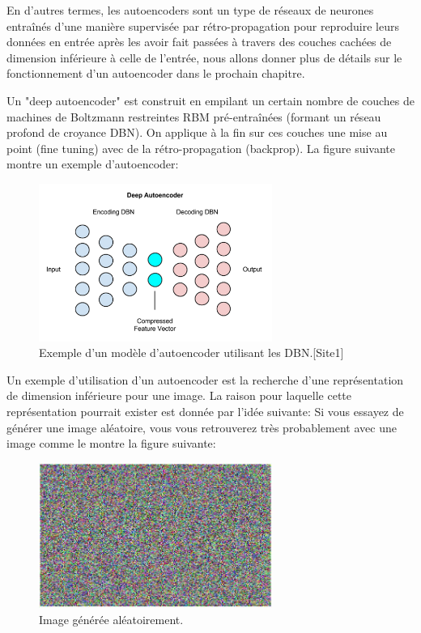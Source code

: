	En d'autres termes, les autoencoders sont un type de réseaux de neurones entraînés d'une manière supervisée par rétro-propagation pour reproduire leurs données en entrée après les avoir fait passées à travers des couches cachées de dimension inférieure à celle de l'entrée, nous allons donner plus de détails sur le fonctionnement d'un autoencoder dans le prochain chapitre.


	Un "deep autoencoder" est construit en empilant un certain nombre de couches de machines de Boltzmann restreintes RBM pré-entraînées (formant un réseau profond de croyance DBN). On applique à la fin sur ces couches une mise au point (fine tuning) avec de la rétro-propagation (backprop). La figure suivante montre un exemple d'autoencoder:

\begin{figure}[H]
\centering
	\includegraphics[width=3in]{Figures/deep_autoencoder.png}
\caption[An Electron]{Exemple d'un modèle d'autoencoder utilisant les DBN.[Site1]}
\label{fig:Electron}
\end{figure}

	Un exemple d'utilisation d'un autoencoder est la recherche d'une représentation de dimension inférieure pour une image. La raison pour laquelle cette représentation pourrait exister est donnée par l'idée suivante: Si vous essayez de générer une image aléatoire, vous vous retrouverez très probablement avec une image comme le montre la figure suivante:

\begin{figure}[H]
	\centering
		\includegraphics[width=3in]{Figures/randomImageGEn.JPG}
	\caption[An Electron]{Image générée aléatoirement.}
	\label{fig:Electron}
\end{figure}


